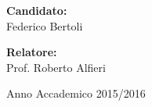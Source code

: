 \begin{titlepage}
\begin{center}
\begin{Large}
	  \begin{minipage}{.45\linewidth}
		  \begin{flushleft}
		    \textbf{Candidato:} \\
			Federico Bertoli
		  	 \end{flushleft}
	  \end{minipage}
	  \hfill
	  \begin{minipage}{.45\linewidth}
		  \begin{flushright}
		    { \textbf{Relatore:} } \\
		    Prof. Roberto Alfieri
		  \end{flushright}
	   \end{minipage}
      
      \vspace{2.0cm}
      
      Anno Accademico 2015/2016
    \end{Large}

  \end{center}

\end{titlepage}
